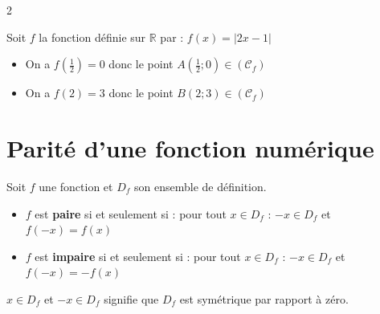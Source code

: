 \begin{multicols}{2}

\begin{Exemple}[][10 min]
Soit $f$ la fonction définie sur $\mathbb{R}$ par : $f(x) = |2x - 1|$
\vspace{0.2cm}
\begin{itemize}
    \item On a $f\!\left(\frac{1}{2}\right) = 0$ donc le point $A\!\left(\frac{1}{2} ; 0\right) \in (\mathcal{C}_f)$
    \item On a $f(2) = 3$ donc le point $B(2 ; 3) \in (\mathcal{C}_f)$
\end{itemize}
\end{Exemple}

\columnbreak



\end{multicols}



\section{Parité d'une fonction numérique }





\begin{Definition}[][]
Soit $f$ une fonction et $D_f$ son ensemble de définition.
\begin{itemize}
    \item $f$ est \textbf{paire} si et seulement si : pour tout $x \in D_f$ : $-x \in D_f$ et $f(-x) = f(x)$
    \item $f$ est \textbf{impaire} si et seulement si : pour tout $x \in D_f$ : $-x \in D_f$ et $f(-x) = -f(x)$
\end{itemize}
\end{Definition}


\begin{Remarque}[][]
 $x \in D_f$ et $-x \in D_f$ signifie que $D_f$ est symétrique par rapport à zéro.
\end{Remarque}


